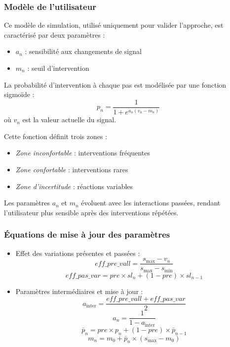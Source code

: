 \documentclass[a4paper,11pt]{article}
\begin{document}
\subsubsection{Modèle de l'utilisateur}

Ce modèle de simulation, utilisé uniquement pour valider l'approche, est caractérisé par deux paramètres : 

\begin{itemize}
    \item $a_n$ : sensibilité aux changements de signal
    \item $m_n$ : seuil d'intervention
\end{itemize}

La probabilité d'intervention à chaque pas est modélisée par une fonction sigmoïde : 
$$p_n = \frac{1}{1+e^{a_n(v_n - m_n)}}$$
où $v_n$ est la valeur actuelle du signal.

Cette fonction définit trois zones : 
\begin{itemize}
    \item \textit{Zone inconfortable} : interventions fréquentes
    \item \textit{Zone confortable} : interventions rares
    \item \textit{Zone d'incertitude} : réactions variables
\end{itemize}

Les paramètres $a_n$ et $m_n$ évoluent avec les interactions passées, rendant l'utilisateur plus sensible après des interventions répétées.

\subsubsection{Équations de mise à jour des paramètres}

\begin{itemize}
    \item Effet des variations présentes et passées :
    $$eff\_pre\_vall = \frac{s_{\text{max}} - v_n}{s_{\text{max}} - s_{\text{min}}}$$
    $$eff\_pas\_var = pre \times sl_n + (1-pre) \times sl_{n-1}$$

    \item Paramètres intermédiaires et mise à jour :
    $$a_{\text{inter}} = \frac{eff\_pre\_vall + eff\_pas\_var}{2}$$
    $$a_n = \frac{1}{1-a_{\text{inter}}}$$
    $$\bar{p}_n = pre \times p_n + (1-pre) \times \bar{p}_{n-1}$$
    $$m_n = m_0 + \bar{p}_n \times (s_{\text{max}} - m_0)$$
\end{itemize}
\end{document}
